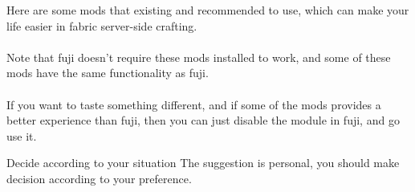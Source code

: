 \label{ch:suggestion}



Here are some mods that existing and recommended to use, which can make your life easier in fabric server-side crafting.\\
\\
Note that fuji doesn't require these mods installed to work, and some of these mods have the same functionality as fuji.\\
\\
If you want to taste something different, and if some of the mods provides a better experience than fuji, then you can just disable the module in fuji, and go use it.

\begin{tips}{Decide according to your situation}
    The suggestion is personal, you should make decision according to your preference.
\end{tips}

\clearpage

